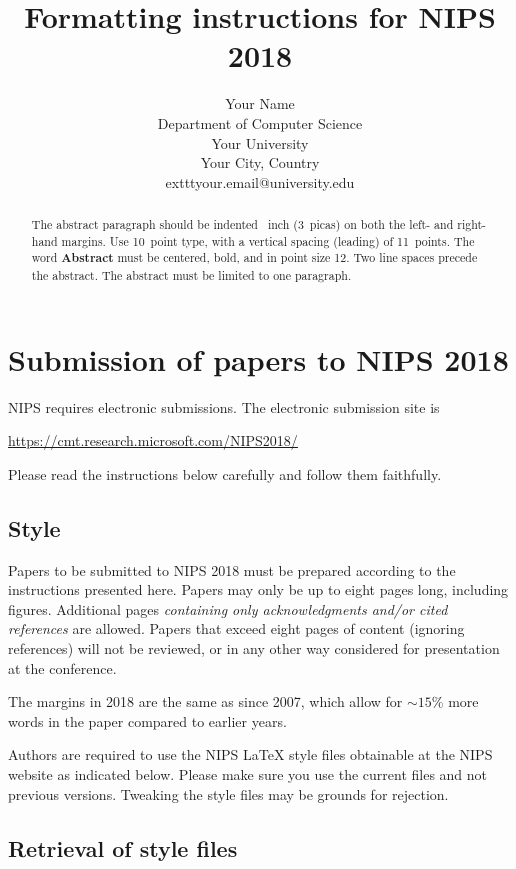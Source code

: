 \documentclass{article}
\title{Formatting instructions for NIPS 2018}
\author{
  Your Name\\
  Department of Computer Science\\
  Your University\\
  Your City, Country\\
  	exttt{your.email@university.edu}
}
\begin{document}

\maketitle

\begin{abstract}
  The abstract paragraph should be indented ~inch
  (3~picas) on both the left- and right-hand margins. Use 10~point
  type, with a vertical spacing (leading) of 11~points.  The word
  \textbf{Abstract} must be centered, bold, and in point size 12. Two
  line spaces precede the abstract. The abstract must be limited to
  one paragraph.
\end{abstract}

\section{Submission of papers to NIPS 2018}

NIPS requires electronic submissions.  The electronic submission site
is
\begin{center}
  \url{https://cmt.research.microsoft.com/NIPS2018/}
\end{center}

Please read the instructions below carefully and follow them faithfully.

\subsection{Style}

Papers to be submitted to NIPS 2018 must be prepared according to the
instructions presented here. Papers may only be up to eight pages
long, including figures. Additional pages \emph{containing only
  acknowledgments and/or cited references} are allowed. Papers that
exceed eight pages of content (ignoring references) will not be
reviewed, or in any other way considered for presentation at the
conference.

The margins in 2018 are the same as since 2007, which allow for
$\sim$$15\%$ more words in the paper compared to earlier years.

Authors are required to use the NIPS \LaTeX{} style files obtainable
at the NIPS website as indicated below. Please make sure you use the
current files and not previous versions. Tweaking the style files may
be grounds for rejection.

\subsection{Retrieval of style files}
\end{document}
